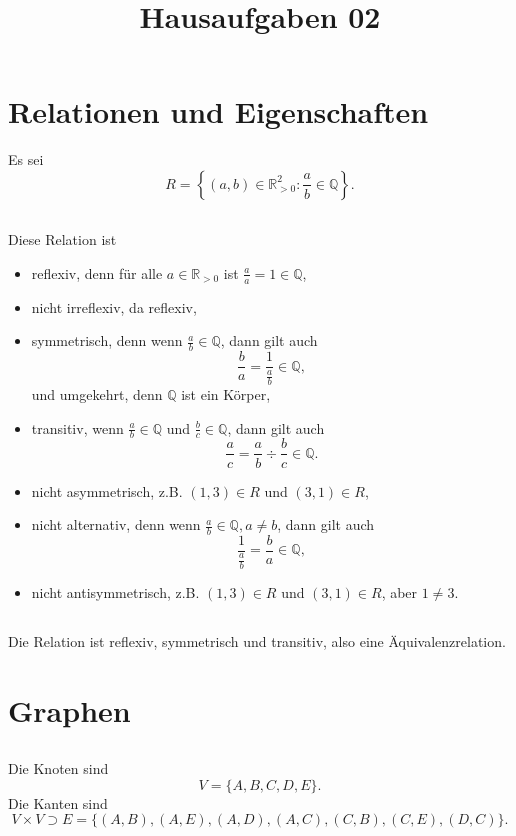 \documentclass[a4paper]{article}
\title{Hausaufgaben 02}
\begin{document}


\section{Relationen und Eigenschaften}
Es sei
$$R = \left \{ (a,b) \in ℝ_{>0}^2 : \frac{a}{b}\in ℚ \right\}.$$
\subsection{}
Diese Relation ist
\begin{itemize}
\item reflexiv, denn für alle $a\in ℝ_{>0}$ ist $\frac{a}{a} = 1 \in ℚ$,
\item nicht irreflexiv, da reflexiv,
\item symmetrisch, denn wenn $\frac{a}{b}\in ℚ$, dann gilt auch 
$$\frac{b}{a} = \frac{1}{\frac{a}{b}} \in ℚ,$$
und umgekehrt, denn $ℚ$ ist ein Körper,
\item transitiv, wenn $\frac{a}{b}\in ℚ$ und $\frac{b}{c}\in ℚ$, dann gilt auch
$$\frac{a}{c} = \frac{a}{b} \div \frac{b}{c} \in ℚ.$$
\item nicht asymmetrisch, z.B. $(1,3)\in R$ und $(3,1)\in R$,
\item nicht alternativ, denn wenn $\frac{a}{b}\in ℚ, a\ne b$, dann gilt auch
$$\frac{1}{\frac{a}{b}} = \frac{b}{a}\in ℚ,$$
\item nicht antisymmetrisch,  z.B. $(1,3)\in R$ und $(3,1)\in R$, aber $1\ne 3$.
\end{itemize}

\subsection{}
Die Relation ist reflexiv, symmetrisch und transitiv, also eine Äquivalenzrelation.
\setcounter{section}{1}
\section{Graphen}
\subsection{}
Die Knoten sind 
$$V = \{ A,B,C, D, E\}.$$
Die Kanten sind
$$V\times V \supset E = \{ (A,B), (A,E), (A,D), (A,C), (C, B), (C,E), (D,C) \}.$$
\end{document}
